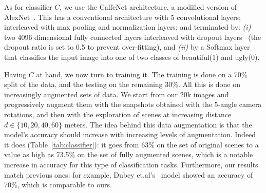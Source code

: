 As for classifier $C$, we use the CaffeNet architecture, a modified version of AlexNet~\cite{krizhevsky2012imagenet,szegedy2015going}. This has a conventional architecture with 5 convolutional layers; interleaved with  max pooling and normalization layers; and terminated by: \emph{(i)} two 4096 dimensional fully connected layers interleaved with dropout layers~\cite{srivastava2014dropout} (the dropout ratio is set to 0.5 to prevent over-fitting), and \emph{(ii)} by a Softmax layer that classifies the input image into one of two classes of beautiful(1) and ugly(0).  

Having $C$ at hand, we now turn to training it. The training is done on a 70\% split of the data, and the testing on the remaining 30\%. All this is done on increasingly augmented sets of data. We start from our 20k images and progressively augment them with  the snapshots obtained with the 5-angle camera rotations, and then with the exploration of scenes at increasing distance $d \in \{10,20,40,60\}$ meters. The idea behind this data augmentation is that the model's accuracy should increase with increasing levels of augmentation. Indeed it does (Table~\ref{tab:classifier}): it goes from 63\% on the set of original scenes to a value as high as  73.5\% on the set of fully augmented scenes, which is a notable increase in accuracy for this type of classification tasks. Furthermore, our results match previous ones: for example,  Dubey et.al's~\cite{dubey2016deep}  model showed an accuracy of 70\%, which is comparable to ours. 





